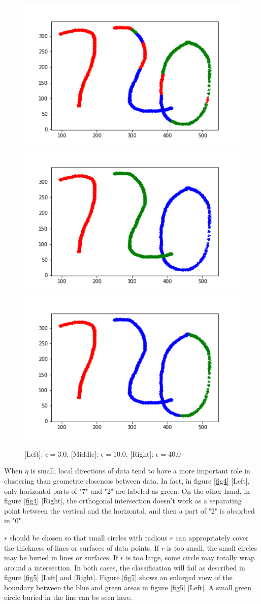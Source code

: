 \documentclass[twoside,11pt]{article}
\begin{document}
\begin{figure}[htbp]
\centering
\vspace{-1em}
\hspace{-2em}
\includegraphics[width=0.37  \textwidth]{eps_small.png}
\hspace{-2em}
\includegraphics[width=0.37  \textwidth]{normal_720.png}
\hspace{-2em}
\includegraphics[width=0.37  \textwidth]{eps_large.png}
\hspace{-2em}
\vspace{-1em}
\caption{[Left]: $\epsilon = 3.0$,  [Middle]: $\epsilon = 10.0$,  [Right]: $\epsilon = 40.0$}
\label{fig6}
\end{figure}




When $\eta$ is small, local directions of data tend to have a more important role in clustering than geometric closeness between data.
In fact, in figure \ref{fig4} [Left], only horizontal parts of "7" and "2" are labeled as green. On the other hand, in figure \ref{fig4} [Right], the orthogonal intersection doesn't work as a separating point between the vertical and the horizontal, and then a part of "2" is absorbed in "0".

$r$ should be chosen so that small circles with radious $r$ can appropriately cover the thickness of lines or surfaces of data points. If $r$ is too small, the small circles may be buried in lines or surfaces. If $r$ is too large, some circle may totally wrap around a intersection. In both cases, the classification will fail as described in figure \ref{fig5} [Left] and [Right]. Figure \ref{fig7} shows an enlarged view of the boundary between the blue and green areas in figure \ref{fig5} [Left]. A small green circle buried in the line can be seen here.
\end{document}

